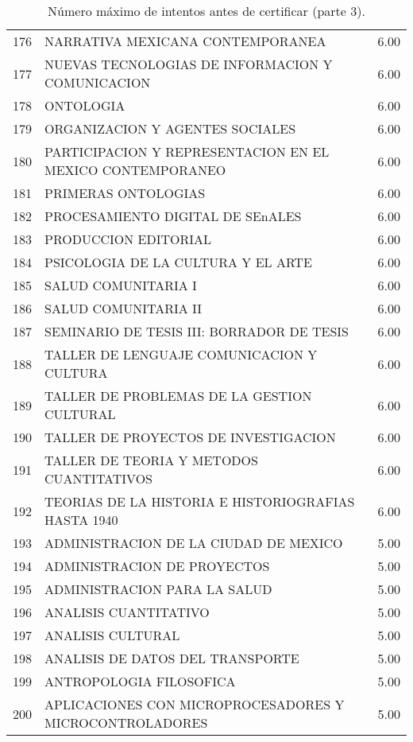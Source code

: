 \documentclass[12pt]{article}
\begin{document}
\begin{table}[ht]
{\begin{tabular}{rlr}
  176 & NARRATIVA MEXICANA CONTEMPORANEA & 6.00 \\ 
  177 & NUEVAS TECNOLOGIAS DE INFORMACION Y COMUNICACION & 6.00 \\ 
  178 & ONTOLOGIA & 6.00 \\ 
  179 & ORGANIZACION Y AGENTES SOCIALES & 6.00 \\ 
  180 & PARTICIPACION Y REPRESENTACION EN EL MEXICO CONTEMPORANEO & 6.00 \\ 
  181 & PRIMERAS ONTOLOGIAS & 6.00 \\ 
  182 & PROCESAMIENTO DIGITAL DE SEnALES & 6.00 \\ 
  183 & PRODUCCION EDITORIAL & 6.00 \\ 
  184 & PSICOLOGIA DE LA CULTURA Y EL ARTE & 6.00 \\ 
  185 & SALUD COMUNITARIA I & 6.00 \\ 
  186 & SALUD COMUNITARIA II & 6.00 \\ 
  187 & SEMINARIO DE TESIS III: BORRADOR DE TESIS & 6.00 \\ 
  188 & TALLER DE LENGUAJE COMUNICACION Y CULTURA & 6.00 \\ 
  189 & TALLER DE PROBLEMAS DE LA GESTION CULTURAL & 6.00 \\ 
  190 & TALLER DE PROYECTOS DE INVESTIGACION & 6.00 \\ 
  191 & TALLER DE TEORIA Y METODOS CUANTITATIVOS & 6.00 \\ 
  192 & TEORIAS DE LA HISTORIA E HISTORIOGRAFIAS HASTA 1940 & 6.00 \\ 
  193 & ADMINISTRACION DE LA CIUDAD DE MEXICO & 5.00 \\ 
  194 & ADMINISTRACION DE PROYECTOS & 5.00 \\ 
  195 & ADMINISTRACION PARA LA SALUD & 5.00 \\ 
  196 & ANALISIS CUANTITATIVO & 5.00 \\ 
  197 & ANALISIS CULTURAL & 5.00 \\ 
  198 & ANALISIS DE DATOS DEL TRANSPORTE & 5.00 \\ 
  199 & ANTROPOLOGIA FILOSOFICA & 5.00 \\ 
  200 & APLICACIONES CON MICROPROCESADORES Y MICROCONTROLADORES & 5.00 \\ 
   \hline
\end{tabular}}
\caption{\label{Num_Max_Intentos_Cert_3} N\'umero m\'aximo de intentos antes de certificar (parte 3).}

\end{table}
\end{document}
